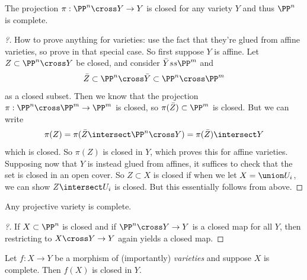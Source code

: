 \begin{corollary}[$\PP^n$ is complete.]

The projection \(\pi: \PP^n\cross Y\to Y\) is closed for any variety
\(Y\) and thus \(\PP^n\) is complete.

\end{corollary}

\begin{proof}[?]

How to prove anything for varieties: use the fact that they're glued
from affine varieties, so prove in that special case. So first suppose
\(Y\) is affine. Let \(Z \subset \PP^n \cross Y\) be closed, and
consider \(\bar Y ss \PP^m\) and
\begin{align*}
\bar Z \subset\PP^n \cross \bar Y \subset\PP^n \cross \PP^m
\end{align*} as a closed subset. Then we know that the projection
\(\pi: \PP^n \cross \PP^m \to \PP^m\) is closed, so
\(\pi(\bar Z) \subset\PP^m\) is closed. But we can write
\begin{align*}
\pi(Z) = \pi(\bar Z \intersect \PP^n \cross Y) = \pi(\bar Z) \intersect Y
\end{align*} which is closed. So \(\pi(Z)\) is closed in \(Y\), which
proves this for affine varieties.\\

Supposing now that \(Y\) is instead glued from affines, it suffices to
check that the set is closed in an open cover. So \(Z \subset X\) is
closed if when we let \(X = \union U_i\), we can show
\(Z \intersect U_i\) is closed. But this essentially follows from above.

\end{proof}

\begin{corollary}

Any projective variety is complete.

\end{corollary}

\begin{proof}[?]

If \(X \subset \PP^n\) is closed and if \(\PP^n \cross Y\to Y\) is a
closed map for all \(Y\), then restricting to \(X\cross Y\to Y\) again
yields a closed map.

\end{proof}

\begin{corollary}

Let \(f:X\to Y\) be a morphism of (importantly) \emph{varieties} and
suppose \(X\) is complete. Then \(f(X)\) is closed in \(Y\).

\end{corollary}

